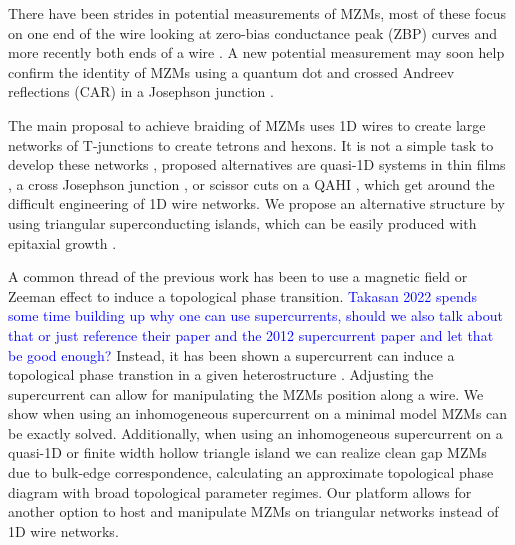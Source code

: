 \documentclass[aps,prb,showpacs,amsmath,amssymb,superscriptaddress]{revtex4-2}
\newcommand{\Blue}[1]{\textcolor{blue}{#1}}
\begin{document}
There have been strides in potential measurements of MZMs, most of these focus on one end of the wire \cite{mourikSignaturesMajoranaFermions2012, rokhinsonFractionalJosephsonEffect2012, dengAnomalousZeroBiasConductance2012, nadj-pergeObservationMajoranaFermions2014, xuExperimentalDetectionMajorana2015, albrechtExponentialProtectionZero2016, sunMajoranaZeroMode2016, wangEvidenceMajoranaBound2018, jackObservationMajoranaZero2019, fornieriEvidenceTopologicalSuperconductivity2019, renTopologicalSuperconductivityPhasecontrolled2019, mannaSignaturePairMajorana2020} looking at zero-bias conductance peak (ZBP) curves and more recently both ends of a wire \cite{schneiderPrecursorsMajoranaModes2022}.
A new potential measurement may soon help confirm the identity of MZMs using a quantum dot and crossed Andreev reflections (CAR) in a Josephson junction \cite{fengProbingRobustMajorana2022}.

The main proposal to achieve braiding of MZMs uses 1D wires to create large networks of T-junctions to create tetrons and hexons.
It is not a simple task to develop these networks \cite{karzigScalableDesignsQuasiparticlepoisoningprotected2017}, proposed alternatives are quasi-1D systems in thin films \cite{potterMultichannelGeneralizationKitaev2010}, a cross Josephson junction \cite{zhouPhaseControlMajorana2020}, or scissor cuts on a QAHI \cite{xieCreatingLocalizedMajorana2021}, which get around the difficult engineering of 1D wire networks.
We propose an alternative structure by using triangular superconducting islands, which can be easily produced with epitaxial growth \cite{pietzschSpinResolvedElectronicStructure2006}.

A common thread of the previous work has been to use a magnetic field or Zeeman effect to induce a topological phase transition.
\Blue{Takasan 2022 spends some time building up why one can use supercurrents, should we also talk about that or just reference their paper and the 2012 supercurrent paper and let that be good enough?}
Instead, it has been shown a supercurrent can induce a topological phase transtion in a given heterostructure \cite{romitoManipulatingMajoranaFermions2012, takasanSupercurrentinducedTopologicalPhase2022}.
Adjusting the supercurrent can allow for manipulating the MZMs position along a wire.
We show when using an inhomogeneous supercurrent on a minimal model MZMs can be exactly solved.
Additionally, when using an inhomogeneous supercurrent on a quasi-1D or finite width hollow triangle island we can realize clean gap MZMs due to bulk-edge correspondence, calculating an approximate topological phase diagram with broad topological parameter regimes.
Our platform allows for another option to host and manipulate MZMs on triangular networks instead of 1D wire networks.
\end{document}
